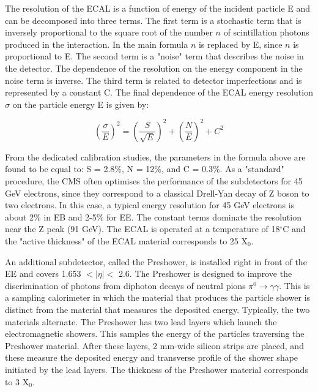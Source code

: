\begin{normalsize}
The resolution of the ECAL is a function of energy of the incident particle E and can be decomposed into three terms. The first term is a stochastic term that is inversely proportional to the square root of the number $n$ of scintillation photons produced in the interaction. In the main formula $n$ is replaced by E, since $n$ is proportional to E. The second term is a "noise" term that describes the noise in the detector. The dependence of the resolution on the energy component in the noise term is inverse. The third term is related to detector imperfections and is represented by a constant C. The final dependence of the ECAL energy resolution $\sigma$ on the particle energy E is given by:

  
\begin{equation}
  \left(\frac{\sigma}{E}\right)^2 = \left(\frac{S}{\sqrt{E}}\right)^2 +
  \left(\frac{N}{E}\right)^2 + C^2
  \label{eq:ecal}
\end{equation}

From the dedicated calibration studies, the parameters in the formula above are found to be equal to: S = 2.8$\%$, N = 12$\%$, and C = 0.3$\%$. As a "standard" procedure, the CMS often optimises the performance of the subdetectors for 45 GeV electrons, since they correspond to a classical Drell-Yan decay of Z boson to two electrons. In this case, a typical energy resolution for 45 GeV electrons is about 2$\%$ in EB and 2-5$\%$ for EE. The constant terms dominate the resolution near the Z peak (91 GeV). The ECAL is operated at a temperature of 18$^{\circ}$C and the "active thickness" of the ECAL material corresponds to 25 X$_0$. 

An additional subdetector, called the Preshower, is installed right in front of the EE and covers 1.653 $ < | \eta |  < $ 2.6. The Preshower is designed to improve the discrimination of photons from diphoton decays of neutral pions $\pi^0 \rightarrow \gamma \gamma$. This is a sampling calorimeter in which the material that produces the particle shower is distinct from the material that measures the deposited energy. Typically, the two materials alternate. The Preshower has two lead layers which launch the electromagnetic showers. This samples the energy of the particles traversing the Preshower material.  After these layers, 2 mm-wide silicon strips are placed, and these measure the deposited energy and transverse profile of the shower shape initiated by the lead layers. The thickness of the Preshower material corresponds to 3 X$_0$.





\end{normalsize}
